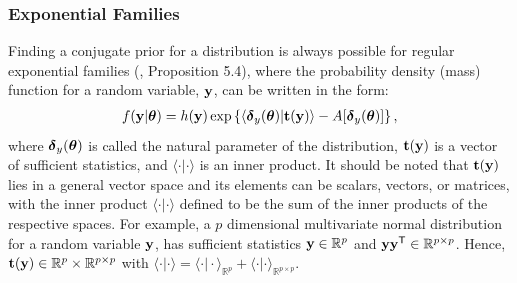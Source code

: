 \documentclass[]{article}
\newcommand{\Real}{\mathbb{R}}
\newcommand{\Tra}{^{\sf T}} %
\newcommand{\V}[1]{{\bm{\mathbf{\MakeLowercase{#1}}}}} %
\def\t{{\bf t}}
\def\y{{\bf y}}
\def \vdelta{{\V{\delta}}}
\def \vtheta{{\V{\theta}}}
\begin{document}
\subsubsection{Exponential Families}

Finding a conjugate prior for a distribution is always possible for regular
exponential families (\citet{bernardo2000}, Proposition 5.4), where the
probability density (mass) function for a random variable, $\y$, can be written
in the form: 
\begin{align} \label{eq:vir:exp-fam}
	f(\y | \vtheta) = h(\y) \exp \left\{ 
		\langle \vdelta_y(\vtheta) | \t(\y) \rangle - 
		A[\vdelta_y(\vtheta)]
	\right\},
\end{align}
where $\vdelta_y(\vtheta)$ is called the natural parameter of the distribution,
$\t(\y)$ is a vector of sufficient statistics, and $\langle \cdot | \cdot
\rangle$ is an inner product. It should be noted that $\t(\y)$ lies in a general
vector space and its elements can be scalars, vectors, or matrices, with the
inner product $\langle \cdot | \cdot \rangle$ defined to be the sum of the inner
products of the respective spaces. For example, a $p$ dimensional multivariate
normal distribution for a random variable $\y$, has sufficient statistics $\y
\in \Real^p$ and $\y\y\Tra \in \Real^{p \times p}$. Hence, $\t(\y) \in
\mathbb{R}^p \times \Real^{p \times p}$ with $\langle \cdot | \cdot \rangle =
\langle \cdot | \cdot \rangle_{\Real^p} + \langle \cdot | \cdot
\rangle_{\Real^{p \times p}}$.  
\end{document}
